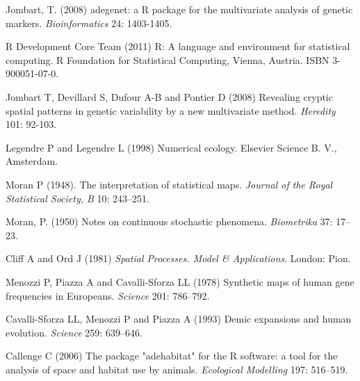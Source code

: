 \documentclass{article}
\begin{document}
\newpage
\begin{thebibliography}{9}

  Jombart, T. (2008) adegenet: a R package for the multivariate
  analysis of genetic markers. \textit{Bioinformatics} 24: 1403-1405.

  R Development Core Team (2011) R: A language and environment for
  statistical computing. R Foundation for Statistical Computing,
  Vienna, Austria. ISBN 3-900051-07-0.



  Jombart T, Devillard S, Dufour A-B and Pontier D (2008) Revealing cryptic spatial
  patterns in genetic variability by a new multivariate method.  \textit{Heredity} 101: 92-103.


  Legendre P and Legendre L (1998) Numerical ecology. Elsevier Science B. V., Amsterdam.

  Moran P (1948). The interpretation of statistical maps.
  \emph{Journal of the Royal Statistical Society, B} 10: 243--251.

  Moran, P. (1950) Notes on continuous stochastic phenomena. \emph{Biometrika} 37: 17--23.

 Cliff A and Ord J (1981) \emph{Spatial Processes. Model \& Applications}. London: Pion.

 Menozzi P, Piazza A and Cavalli-Sforza LL (1978) Synthetic maps of human gene frequencies in {Europeans}.
  \emph{Science} 201: 786--792.

Cavalli-Sforza LL, Menozzi P and Piazza A (1993) Demic expansions and human evolution.
 \textit{Science} 259: 639--646.

  Callenge C (2006) The package "adehabitat" for the R software: a tool for the analysis
  of space and habitat use by animals. \textit{Ecological Modelling} 197: 516--519.




\end{thebibliography}
\end{document}
